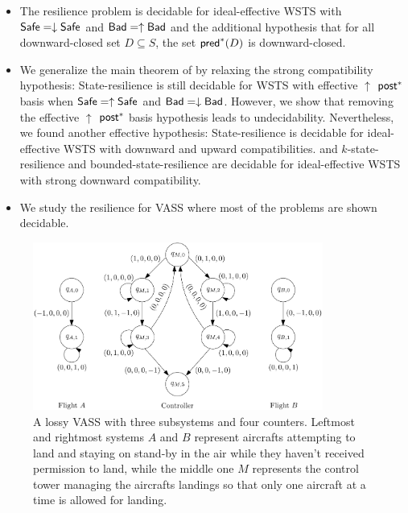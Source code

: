 \begin{itemize}
\item The resilience problem is decidable for ideal-effective WSTS with 
$\textsf{Safe}=\downarrow \textsf{Safe}$
and $\textsf{Bad}=\uparrow \textsf{Bad}$
and
the additional hypothesis that
for all downward-closed set $D \subseteq S$, the set $\textsf{pred}^*(D)$ is downward-closed.
%

\item We generalize the main theorem of \cite{DBLP:journals/corr/abs-2108-00889,DBLP:conf/gg/Ozkan22} by relaxing the strong compatibility hypothesis: {\sc State-resilience} is still decidable for 
 WSTS with effective 
$\uparrow$ $\textsf{post}^*$ basis
when
$\textsf{Safe}=\uparrow \textsf{Safe}$
and $\textsf{Bad}=\downarrow \textsf{Bad}$. However, we show that removing the effective 
$\uparrow$ $\textsf{post}^*$ basis hypothesis leads to undecidability. Nevertheless, we found another effective hypothesis: {\sc State-resilience} is decidable for ideal-effective WSTS with downward and upward compatibilities. and {\sc $k$-state-resilience} and {\sc bounded-state-resilience} are decidable for ideal-effective WSTS with strong downward compatibility.
%

\item We study the resilience for VASS where most of the problems are shown decidable.
\end{itemize}

 
\begin{center}
	\begin{figure}
			\hspace{0.75cm}
\includegraphics[width=0.85\textwidth]{FigureB}
	\caption{A lossy VASS with three subsystems and four counters. Leftmost and rightmost systems $A$ and $B$ represent aircrafts attempting to land and staying on stand-by in the air while they haven't received permission to land, while the middle one $M$ represents the control tower managing the aircrafts landings so that only one aircraft at a time is allowed for landing.}
					\label{air control}
	\end{figure}
\end{center}

